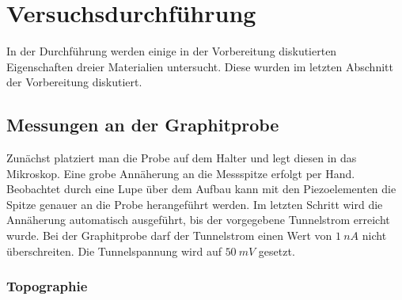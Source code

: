 \chapter{Versuchsdurchführung}

In der Durchführung werden einige in der Vorbereitung diskutierten Eigenschaften 
dreier Materialien untersucht. Diese wurden im letzten Abschnitt der Vorbereitung
diskutiert. 

\section{Messungen an der Graphitprobe}

Zunächst platziert man die Probe auf dem Halter und legt diesen in das Mikroskop. 
Eine grobe Annäherung an die Messspitze erfolgt per Hand. Beobachtet durch eine
Lupe über dem Aufbau kann mit den Piezoelementen die Spitze genauer an die Probe
herangeführt werden. Im letzten Schritt wird die Annäherung automatisch 
ausgeführt, bis der vorgegebene Tunnelstrom erreicht wurde. Bei der Graphitprobe
darf der Tunnelstrom einen Wert von $\SI{1}{nA}$ nicht überschreiten. Die 
Tunnelspannung wird auf $\SI{50}{mV}$ gesetzt.\par

\subsection{Topographie}

